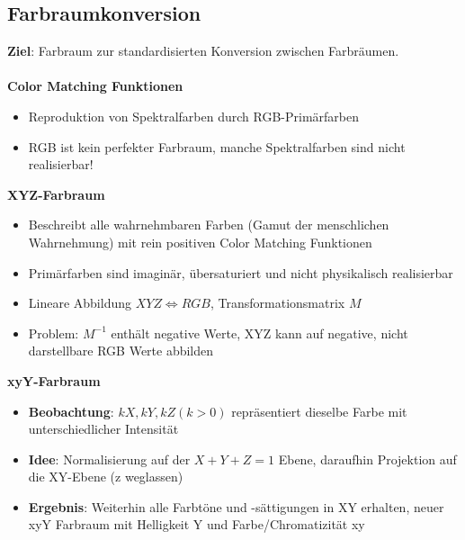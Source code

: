 \subsection{Farbraumkonversion}%
\label{bfp:sub:farbraumkonversion}

\textbf{Ziel}: Farbraum zur standardisierten Konversion zwischen Farbräumen.\\\\
\textbf{Color Matching Funktionen}
	\begin{itemize}
		\item Reproduktion von Spektralfarben durch RGB-Primärfarben
		\item RGB ist kein perfekter Farbraum, manche Spektralfarben sind nicht realisierbar!
	\end{itemize}		
\textbf{XYZ-Farbraum}
	\begin{itemize}
		\item Beschreibt alle wahrnehmbaren Farben (\glqq Gamut der menschlichen Wahrnehmung\grqq) mit rein positiven Color Matching Funktionen
		\item Primärfarben sind imaginär, übersaturiert und nicht physikalisch realisierbar
		\item Lineare Abbildung $XYZ \Leftrightarrow RGB$, Transformationsmatrix $M$
		\item Problem: $M^{-1}$ enthält negative Werte, XYZ kann auf negative, nicht darstellbare RGB Werte abbilden
	\end{itemize}
\textbf{xyY-Farbraum}
	\begin{itemize}
		\item \textbf{Beobachtung}: $kX, kY, kZ (k > 0)$ repräsentiert dieselbe Farbe mit unterschiedlicher Intensität
		\item \textbf{Idee}: Normalisierung auf der $X + Y + Z = 1$ Ebene, daraufhin Projektion auf die XY-Ebene (z weglassen)
		\item \textbf{Ergebnis}: Weiterhin alle Farbtöne und -sättigungen in XY erhalten, neuer xyY Farbraum mit Helligkeit Y und Farbe/Chromatizität xy
	\end{itemize}